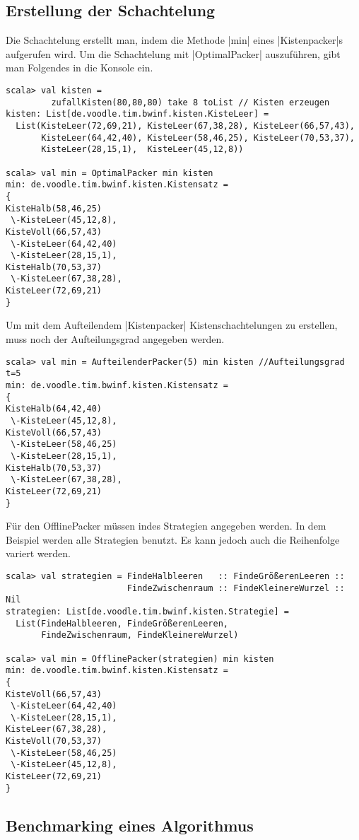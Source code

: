 \subsection{Erstellung der Schachtelung}
Die Schachtelung erstellt man, indem die Methode |min| eines |Kistenpacker|s aufgerufen wird.
Um die Schachtelung mit |OptimalPacker| auszuführen, gibt man Folgendes in die Konsole ein.
\begin{lstlisting}
scala> val kisten =
         zufallKisten(80,80,80) take 8 toList // Kisten erzeugen
kisten: List[de.voodle.tim.bwinf.kisten.KisteLeer] =
  List(KisteLeer(72,69,21), KisteLeer(67,38,28), KisteLeer(66,57,43),
       KisteLeer(64,42,40), KisteLeer(58,46,25), KisteLeer(70,53,37),
       KisteLeer(28,15,1),  KisteLeer(45,12,8))

scala> val min = OptimalPacker min kisten
min: de.voodle.tim.bwinf.kisten.Kistensatz = 
{
KisteHalb(58,46,25)
 \-KisteLeer(45,12,8),
KisteVoll(66,57,43)
 \-KisteLeer(64,42,40)
 \-KisteLeer(28,15,1),
KisteHalb(70,53,37)
 \-KisteLeer(67,38,28),
KisteLeer(72,69,21)
}
\end{lstlisting}
Um mit dem Aufteilendem |Kistenpacker| Kistenschachtelungen zu erstellen, muss noch der Aufteilungsgrad angegeben werden.
\begin{lstlisting}
scala> val min = AufteilenderPacker(5) min kisten //Aufteilungsgrad t=5
min: de.voodle.tim.bwinf.kisten.Kistensatz = 
{
KisteHalb(64,42,40)
 \-KisteLeer(45,12,8),
KisteVoll(66,57,43)
 \-KisteLeer(58,46,25)
 \-KisteLeer(28,15,1),
KisteHalb(70,53,37)
 \-KisteLeer(67,38,28),
KisteLeer(72,69,21)
}
\end{lstlisting}
Für den OfflinePacker müssen indes Strategien angegeben werden.
In dem Beispiel werden alle Strategien benutzt.
Es kann jedoch auch die Reihenfolge variert werden.
\begin{lstlisting}
scala> val strategien = FindeHalbleeren   :: FindeGrößerenLeeren ::
                        FindeZwischenraum :: FindeKleinereWurzel :: Nil
strategien: List[de.voodle.tim.bwinf.kisten.Strategie] =
  List(FindeHalbleeren, FindeGrößerenLeeren,
       FindeZwischenraum, FindeKleinereWurzel)

scala> val min = OfflinePacker(strategien) min kisten
min: de.voodle.tim.bwinf.kisten.Kistensatz = 
{
KisteVoll(66,57,43)
 \-KisteLeer(64,42,40)
 \-KisteLeer(28,15,1),
KisteLeer(67,38,28),
KisteVoll(70,53,37)
 \-KisteLeer(58,46,25)
 \-KisteLeer(45,12,8),
KisteLeer(72,69,21)
}

\end{lstlisting}
\subsection{Benchmarking eines Algorithmus}
